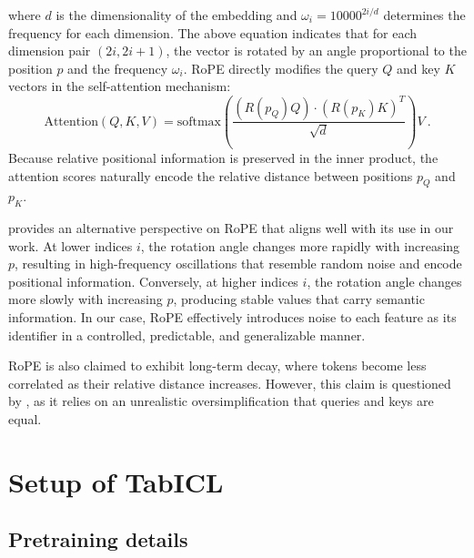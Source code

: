 \documentclass{article}
\theoremstyle{plain}
\theoremstyle{definition}
\theoremstyle{remark}
\begin{document}
where $d$ is the dimensionality of the embedding and $\omega_{i}=10000^{2i/d}$ determines the frequency for each dimension. The above equation indicates that for each dimension pair $(2i, 2i+1)$, the vector is rotated by an angle proportional to the position $p$ and the frequency $\omega_{i}$. RoPE directly modifies the query $Q$ and key $K$ vectors in the self-attention mechanism:
$$
\text{Attention}(Q, K, V) = \text{softmax}\left(\frac{(R(p_Q)Q) \cdot (R(p_K)K)^T}{\sqrt{d}}\right) V~.
$$
Because relative positional information is preserved in the inner product, the attention scores naturally encode the relative distance between positions $p_Q$ and $p_K$.

\citet{barberoWeGoWhat2024} provides an alternative perspective on RoPE that aligns well with its use in our work. At lower indices \(i\), the rotation angle changes more rapidly with increasing \(p\), resulting in high-frequency oscillations that resemble random noise and encode positional information. Conversely, at higher indices \(i\), the rotation angle changes more slowly with increasing \(p\), producing stable values that carry semantic information. In our case, RoPE effectively introduces noise to each feature as its identifier in a controlled, predictable, and generalizable manner.

RoPE is also claimed to exhibit long-term decay, where tokens become less correlated as their relative distance increases. However, this claim is questioned by \citet{barberoWeGoWhat2024}, as it relies on an unrealistic oversimplification that queries and keys are equal.


\section{Setup of TabICL}
\subsection{Pretraining details}
\label{app:pretraining}
\end{document}
